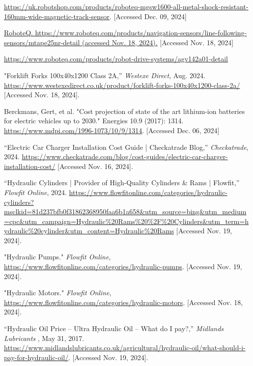 \documentclass[12pt]{article}
\begin{document}
\begin{thebibliography}{99}

\footnotesize
\setlength{\baselineskip}{0.8\baselineskip}

 \url{https://uk.robotshop.com/products/roboteq-mgsw1600-all-metal-shock-resistant-160mm-wide-magnetic-track-sensor}. [Accessed Dec. 09, 2024]

 \url{RoboteQ. https://www.roboteq.com/products/navigation-sensors/line-following-sensors/mtape25nr-detail (accessed Nov. 18, 2024).} [Accessed Nov. 18, 2024]

 \url{https://www.roboteq.com/products/robot-drive-systems/agv142a01-detail}

 "Forklift Forks 100x40x1200 Class 2A,” \textit{Westexe Direct}, Aug. 2024. \url{https://www.westexedirect.co.uk/product/forklift-forks-100x40x1200-class-2a/} [Accessed Nov. 18, 2024].

 Berckmans, Gert, et al. "Cost projection of state of the art lithium-ion batteries for electric vehicles up to 2030." Energies 10.9 (2017): 1314. \url{https://www.mdpi.com/1996-1073/10/9/1314}. [Accessed Dec. 06, 2024]

 “Electric Car Charger Installation Cost Guide | Checkatrade Blog,” \textit{Checkatrade}, 2024. \url{https://www.checkatrade.com/blog/cost-guides/electric-car-charger-installation-cost/} [Accessed Nov. 16, 2024].

 “Hydraulic Cylinders | Provider of High-Quality Cylinders \& Rams | Flowfit,” \textit{Flowfit Online}, 2024. \url{https://www.flowfitonline.com/categories/hydraulic-cylinders?msclkid=81d237bfb0f31862368950faa6b1a658&utm_source=bing&utm_medium=cpc&utm_campaign=Hydraulic%20Rams%20%2F%20Cylinders&utm_term=hydraulic%20cylinder&utm_content=Hydraulic%20Rams} [Accessed Nov. 19, 2024].

 "Hydraulic Pumps." \textit{Flowfit Online}, \url{https://www.flowfitonline.com/categories/hydraulic-pumps}. [Accessed Nov. 19, 2024].

 "Hydraulic Motors." \textit{Flowfit Online}, \url{https://www.flowfitonline.com/categories/hydraulic-motors}. [Accessed Nov. 18, 2024].

 “Hydraulic Oil Price – Ultra Hydraulic Oil – What do I pay?,” \textit{Midlands Lubricants} , May 31, 2017. \url{https://www.midlandslubricants.co.uk/agricultural/hydraulic-oil/what-should-i-pay-for-hydraulic-oil/}. [Accessed Nov. 19, 2024].


\end{thebibliography}
\end{document}
